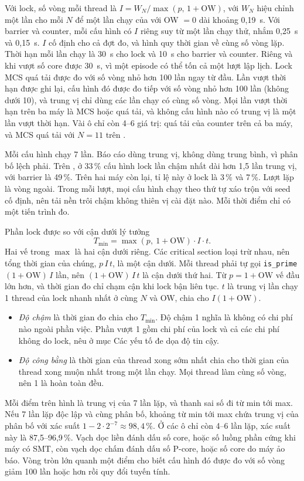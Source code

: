 Với lock, số vòng mỗi thread là $I = W_N/\max(p,\,1+\mathrm{OW})$, với $W_N$ hiệu chỉnh một lần cho mỗi
$N$ để một lần chạy của  với OW $=0$ dài khoảng 0,19~s. Với barrier và counter, mỗi cấu hình
có $I$ riêng suy từ một lần chạy thử, nhắm 0,25~s và 0,15~s. $I$ cố định cho cả đợt đo, và hình quy thời
gian về cùng số vòng lặp. Thời hạn mỗi lần chạy là 30~s cho lock và 10~s cho barrier và counter. Riêng
 và  khi vượt số core được 30~s, vì một episode có thể tốn cả một lượt lập
lịch. Lock MCS quá tải được đo với số vòng nhỏ hơn 100 lần ngay từ đầu. Lần vượt thời hạn được ghi lại, cấu hình đó
được đo tiếp với số vòng nhỏ hơn 100 lần (không dưới 10), và trung vị chỉ dùng các lần chạy có cùng số
vòng. Mọi lần vượt thời hạn trên ba máy là MCS hoặc  quá tải, và không cấu hình nào có
trung vị là một lần vượt thời hạn. Vài ô chỉ còn 4--6 giá trị:  quá tải của counter
trên cả ba máy, và MCS quá tải với $N = 11$ trên .

Mỗi cấu hình chạy 7 lần. Báo cáo dùng trung vị, không dùng trung bình, vì phân bố lệch phải. Trên
, ở 33\,\% cấu hình lock lần chậm nhất dài hơn 1,5 lần trung vị, với barrier là 49\,\%.
Trên hai máy còn lại, tỉ lệ này ở lock là 3\,\% và 7\,\%. Lượt lặp là vòng ngoài.
Trong mỗi lượt, mọi cấu hình chạy theo thứ tự xáo trộn với seed cố định, nên tải nền trôi chậm không
thiên vị cài đặt nào. Mỗi thời điểm chỉ có một tiến trình đo.

Phần lock được so với cận dưới lý tưởng
\[ T_{\min} = \max(p,\ 1+\mathrm{OW})\cdot I\cdot t. \]
Hai vế trong $\max$ là hai cận dưới riêng. Các critical section loại trừ nhau, nên tổng thời gian của
chúng, $p\,I\,t$, là một cận dưới. Mỗi thread phải tự gọi \texttt{is\_prime} $(1+\mathrm{OW})\,I$ lần,
nên $(1+\mathrm{OW})\,I\,t$ là cận dưới thứ hai. Từ $p = 1+\mathrm{OW}$ vế đầu lớn hơn, và thời gian
đo chỉ chạm cận khi lock bận liên tục. $t$ là trung vị lần chạy 1 thread của lock nhanh nhất ở cùng $N$
và OW, chia cho $I(1+\mathrm{OW})$.
\begin{itemize}[nosep]
  \item \emph{Độ chậm} là thời gian đo chia cho $T_{\min}$. Độ chậm 1 nghĩa là không có chi phí nào
    ngoài phần việc. Phần vượt 1 gồm chi phí của lock và cả các chi phí không do lock, nêu ở mục Các
    yếu tố đe dọa độ tin cậy.
  \item \emph{Độ công bằng} là thời gian của thread xong sớm nhất chia cho thời gian của thread xong
    muộn nhất trong một lần chạy. Mọi thread làm cùng số vòng, nên 1 là hoàn toàn đều.
\end{itemize}

Mỗi điểm trên hình là trung vị của 7 lần lặp, và thanh sai số đi từ min tới max. Nếu 7 lần lặp độc
lập và cùng phân bố, khoảng từ min tới max chứa trung vị của phân bố với xác suất $1 - 2 \cdot 2^{-7}
\approx 98{,}4\,\%$. Ở các ô chỉ còn 4--6 lần lặp, xác suất này là 87,5--96,9\,\%. Vạch dọc liền đánh dấu số core, hoặc số luồng phần cứng khi máy
có SMT, còn vạch dọc chấm đánh dấu số P-core, hoặc số core do máy ảo báo. Vòng tròn lớn quanh một điểm
cho biết cấu hình đó được đo với số vòng giảm 100 lần hoặc hơn rồi quy đổi tuyến tính.
